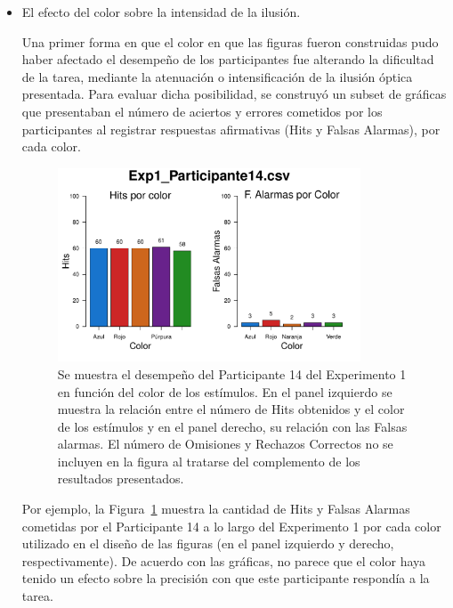 \begin{itemize}
\item El efecto del color sobre la intensidad de la ilusión.

Una primer forma en que el color en que las figuras fueron construidas pudo haber afectado el desempeño de los participantes fue alterando la dificultad de la tarea, mediante la atenuación o intensificación de la ilusión óptica presentada. Para evaluar dicha posibilidad, se construyó un subset de gráficas que presentaban el número de aciertos y errores cometidos por los participantes al registrar respuestas afirmativas (Hits y Falsas Alarmas), por cada color.\\

\begin{figure}[th]
\centering
\includegraphics[width=0.85\textwidth]{Figures/Color_Exp1_P14}
\caption[Hits y Falsas Alarmas por Color; Ejemplo]{Se muestra el desempeño del Participante 14 del Experimento 1 en función del color de los estímulos. En el panel izquierdo se muestra la relación entre el número de Hits obtenidos y el color de los estímulos y en el panel derecho, su relación con las Falsas alarmas. El número de Omisiones y Rechazos Correctos no se incluyen en la figura al tratarse del complemento de los resultados presentados.}
\label{fig:Color_E1_P14}
\end{figure}

Por ejemplo, la Figura~\ref{fig:Color_E1_P14} muestra la cantidad de Hits y Falsas Alarmas cometidas por el Participante 14 a lo largo del Experimento 1 por cada color utilizado en el diseño de las figuras (en el panel izquierdo y derecho, respectivamente). De acuerdo con las gráficas, no parece que el color haya tenido un efecto sobre la precisión con que este participante respondía a la tarea.\\


\end{itemize}
